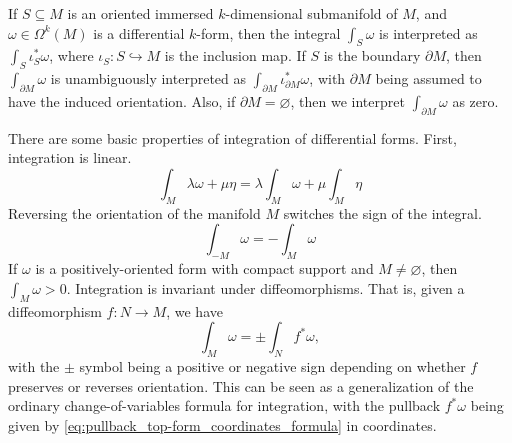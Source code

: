 \documentclass[a4paper,12pt]{article}
\begin{document}
If $S \subseteq M$ is an oriented immersed $k$-dimensional submanifold of $M$, and $\omega \in \Omega^k(M)$ is a differential $k$-form, then the integral $\int_S \omega$ is interpreted as $\int_S \iota^*_S \omega$, where $\iota_S \colon S \hookrightarrow M$ is the inclusion map.
If $S$ is the boundary $\partial M$, then $\int_{\partial M} \omega$ is unambiguously interpreted as $\int_{\partial M} \iota^*_{\partial M} \omega$, with $\partial M$ being assumed to have the induced orientation.
Also, if $\partial M = \varnothing$, then we interpret $\int_{\partial M} \omega$ as zero.

There are some basic properties of integration of differential forms.
First, integration is linear.
\begin{equation}
    \int_M \lambda \omega + \mu \eta = \lambda \int_M \omega + \mu \int_M \eta
\end{equation}
Reversing the orientation of the manifold $M$ switches the sign of the integral.
\begin{equation}
    \int_{-M} \omega = - \int_M \omega
\end{equation}
If $\omega$ is a positively-oriented form with compact support and $M \neq \varnothing$, then $\int_M \omega > 0$.
Integration is invariant under diffeomorphisms.
That is, given a diffeomorphism $f \colon N \to M$, we have
\begin{equation}
    \int_M \omega = \pm \int_N f^* \omega,
\end{equation}
with the $\pm$ symbol being a positive or negative sign depending on whether $f$ preserves or reverses orientation.
This can be seen as a generalization of the ordinary change-of-variables formula for integration, with the pullback $f^*\omega$ being given by \eqref{eq:pullback_top-form_coordinates_formula} in coordinates.
\end{document}
